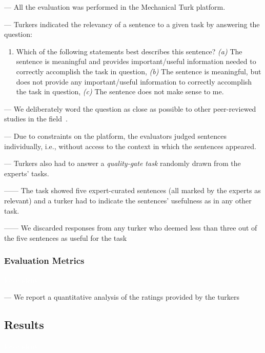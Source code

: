 --- All the evaluation was performed in the Mechanical Turk platform. \vspace{3mm}

--- Turkers indicated the relevancy of a sentence to a given task  by answering the question: \vspace{3mm}

\begin{enumerate}[leftmargin=\parindent, font=\normalfont\itshape, label=SR\textsubscript{\arabic*}]
    \item Which of the following statements best describes this sentence? 
    \textit{(a)} The sentence is meaningful and provides important/useful information needed to correctly accomplish the task in question, 
    \textit{(b)} The sentence is meaningful, but does not provide any important/useful information to correctly accomplish the task in question, 
    \textit{(c)} The sentence does not make sense to me.
\end{enumerate}

--- We deliberately word the question as close as possible to other peer-reviewed studies in the field~\cite{nadi2020, Xu2017}. \vspace{3mm}


--- Due to constraints on the platform, the evaluators judged sentences individually, i.e., without access to the context in which the sentences appeared. \vspace{3mm}

--- Turkers also had to answer a \textit{quality-gate task} randomly drawn from the experts' tasks.

------ The task showed five expert-curated sentences (all marked by the experts as relevant) and a turker had to indicate the sentences' usefulness as in any other task.

------ We discarded responses from any turker who deemed less than three out of the five sentences as useful for the task


\subsubsection{Evaluation Metrics}
\textcolor{white}{force ident} %

--- We report a quantitative analysis of the ratings provided by the turkers




\subsection{Results}
\textcolor{white}{force ident} %

